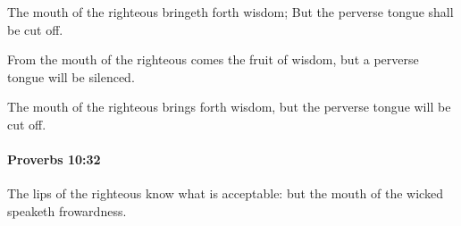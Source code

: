 			\begin{versebox}
					\item[BHS] 
					\item[ASV] The mouth of the righteous bringeth forth wisdom; But the perverse tongue shall be cut off.
					\item[NIV] From the mouth of the righteous comes the fruit of wisdom, but a perverse tongue will be silenced.
					\item[NRSV] The mouth of the righteous brings forth wisdom, but the perverse tongue will be cut off.
			\end{versebox}

		\paragraph{Proverbs 10:32} %
			\label{PROVERBS-10-32}

			The lips of the righteous know what is acceptable: but the mouth of the wicked speaketh frowardness.

